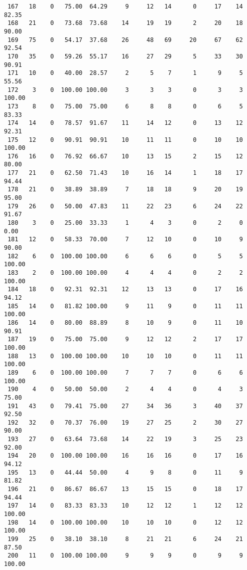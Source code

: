 \begin{verbatim}
 167   18    0   75.00  64.29     9     12   14      0     17    14    82.35
 168   21    0   73.68  73.68    14     19   19      2     20    18    90.00
 169   75    0   54.17  37.68    26     48   69     20     67    62    92.54
 170   35    0   59.26  55.17    16     27   29      5     33    30    90.91
 171   10    0   40.00  28.57     2      5    7      1      9     5    55.56
 172    3    0  100.00 100.00     3      3    3      0      3     3   100.00
 173    8    0   75.00  75.00     6      8    8      0      6     5    83.33
 174   14    0   78.57  91.67    11     14   12      0     13    12    92.31
 175   12    0   90.91  90.91    10     11   11      0     10    10   100.00
 176   16    0   76.92  66.67    10     13   15      2     15    12    80.00
 177   21    0   62.50  71.43    10     16   14      1     18    17    94.44
 178   21    0   38.89  38.89     7     18   18      9     20    19    95.00
 179   26    0   50.00  47.83    11     22   23      6     24    22    91.67
 180    3    0   25.00  33.33     1      4    3      0      2     0     0.00
 181   12    0   58.33  70.00     7     12   10      0     10     9    90.00
 182    6    0  100.00 100.00     6      6    6      0      5     5   100.00
 183    2    0  100.00 100.00     4      4    4      0      2     2   100.00
 184   18    0   92.31  92.31    12     13   13      0     17    16    94.12
 185   14    0   81.82 100.00     9     11    9      0     11    11   100.00
 186   14    0   80.00  88.89     8     10    9      0     11    10    90.91
 187   19    0   75.00  75.00     9     12   12      2     17    17   100.00
 188   13    0  100.00 100.00    10     10   10      0     11    11   100.00
 189    6    0  100.00 100.00     7      7    7      0      6     6   100.00
 190    4    0   50.00  50.00     2      4    4      0      4     3    75.00
 191   43    0   79.41  75.00    27     34   36      3     40    37    92.50
 192   32    0   70.37  76.00    19     27   25      2     30    27    90.00
 193   27    0   63.64  73.68    14     22   19      3     25    23    92.00
 194   20    0  100.00 100.00    16     16   16      0     17    16    94.12
 195   13    0   44.44  50.00     4      9    8      0     11     9    81.82
 196   21    0   86.67  86.67    13     15   15      0     18    17    94.44
 197   14    0   83.33  83.33    10     12   12      1     12    12   100.00
 198   14    0  100.00 100.00    10     10   10      0     12    12   100.00
 199   25    0   38.10  38.10     8     21   21      6     24    21    87.50
 200   11    0  100.00 100.00     9      9    9      0      9     9   100.00

\end{verbatim}
